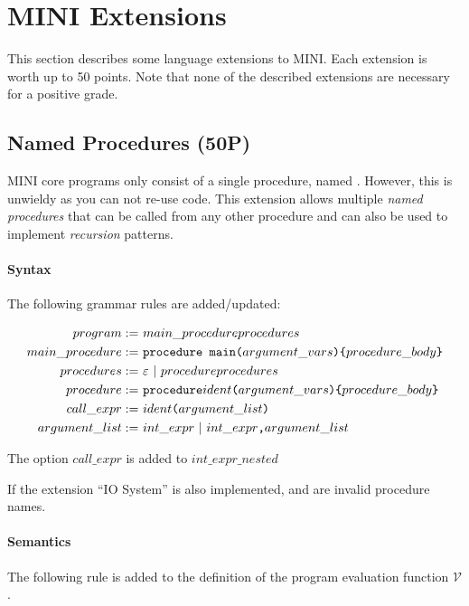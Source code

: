 \documentclass{article}
\newcommand\inParens[1]{\texttt{(}#1\texttt{)}}
\newcommand\inBraces[1]{\texttt{\{}#1\texttt{\}}}
\newcommand\comma{\texttt{,}}
\begin{document}
\section{MINI Extensions}

This section describes some language extensions to MINI. Each extension is worth up to 50 points. Note that none of the described extensions are necessary for a positive grade.

\subsection{Named Procedures (50P)}

MINI core programs only consist of a single procedure, named . However, this is unwieldy as you can not re-use code.
This extension allows multiple \textit{named procedures} that can be called from any other procedure and can also be used to implement \textit{recursion} patterns.

\paragraph{Syntax}

The following grammar rules are added/updated:


\begin{align}
program :=& \ main\_procedure\space procedures \\
main\_procedure :=& \ \texttt{procedure main}\inParens{argument\_vars} \inBraces{procedure\_body} \\
procedures :=& \ \varepsilon \ | \ procedure \space procedures \\
procedure :=& \ \texttt{procedure}\space ident\inParens{argument\_vars} \inBraces{procedure\_body} \\
call\_expr :=& \ ident\inParens{argument\_list} \\
argument\_list :=& \ int\_expr \ | \ int\_expr\comma argument\_list
\end{align}


The option $call\_expr$ is added to $int\_expr\_nested$

If the extension ``IO System'' is also implemented,  and  are invalid procedure names.

\paragraph{Semantics}

The following rule is added to the definition of the program evaluation function $\mathcal{V}$.
\end{document}
